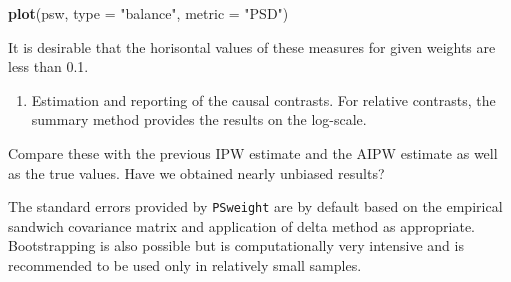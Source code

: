\documentclass[
]{book}
\newenvironment{Shaded}{\begin{snugshade}}{\end{snugshade}}
\newcommand{\AttributeTok}[1]{\textcolor[rgb]{0.13,0.29,0.53}{#1}}
\newcommand{\DecValTok}[1]{\textcolor[rgb]{0.00,0.00,0.81}{#1}}
\newcommand{\FunctionTok}[1]{\textcolor[rgb]{0.13,0.29,0.53}{\textbf{#1}}}
\newcommand{\NormalTok}[1]{#1}
\newcommand{\OtherTok}[1]{\textcolor[rgb]{0.56,0.35,0.01}{#1}}
\newcommand{\SpecialCharTok}[1]{\textcolor[rgb]{0.81,0.36,0.00}{\textbf{#1}}}
\newcommand{\StringTok}[1]{\textcolor[rgb]{0.31,0.60,0.02}{#1}}
\providecommand{\tightlist}{%
  \setlength{\itemsep}{0pt}\setlength{\parskip}{0pt}}
\begin{document}
\begin{Shaded}
\begin{Highlighting}[]
\FunctionTok{plot}\NormalTok{(psw, }\AttributeTok{type =} \StringTok{"balance"}\NormalTok{, }\AttributeTok{metric =} \StringTok{"PSD"}\NormalTok{)}
\end{Highlighting}
\end{Shaded}

It is desirable that the horisontal values of these measures for given
weights are less than 0.1.

\begin{enumerate}
\def\labelenumi{\arabic{enumi}.}
\setcounter{enumi}{2}
\tightlist
\item
  Estimation and reporting of the causal contrasts.
  For relative contrasts, the summary method provides the results
  on the log-scale.
\end{enumerate}

\begin{Shaded}
\end{Shaded}

Compare these with the previous IPW estimate and the
AIPW estimate as well as the
true values. Have we obtained nearly unbiased results?

The standard errors provided by
\texttt{PSweight} are by default based on the empirical sandwich
covariance matrix and application
of delta method as appropriate. Bootstrapping is also possible but is
computationally very intensive and is
recommended to be used only in relatively small samples.
\end{document}
